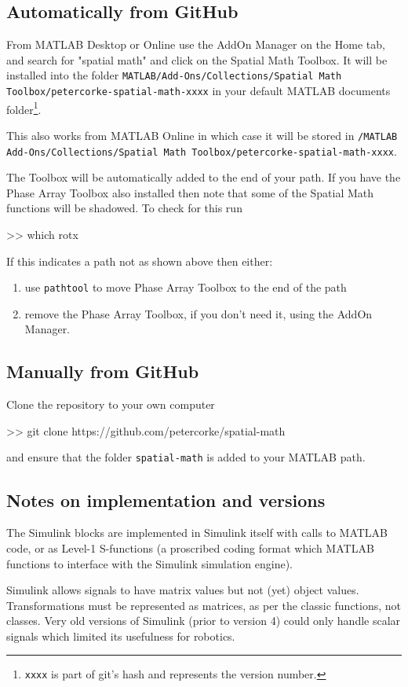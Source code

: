 \documentclass[a4paper,twoside]{report}
\begin{document}
\subsection{Automatically from GitHub}
From MATLAB Desktop or Online use the AddOn Manager on the Home tab, and search for "spatial math" and click on the Spatial Math Toolbox.
It will be installed into the folder \texttt{MATLAB/Add-Ons/Collections/Spatial Math Toolbox/petercorke-spatial-math-xxxx} in your default MATLAB
documents folder\footnote{\texttt{xxxx} is part of git's hash and represents the version number.}.

This also works from MATLAB Online in which case it will be stored in  \texttt{/MATLAB Add-Ons/Collections/Spatial Math Toolbox/petercorke-spatial-math-xxxx}.

The Toolbox will be automatically added to the end of your path.  If you have the Phase Array Toolbox also installed then note that some of the Spatial Math functions will be shadowed.  To check for this run
\begin{Code}
>> which rotx
\end{Code}
If this indicates a path not as shown above then  either:
\begin{enumerate}
\item use \texttt{pathtool} to move Phase Array Toolbox to the end of the path
\item remove the Phase Array Toolbox, if you don't need it, using the AddOn Manager. 
\end{enumerate}

\subsection{Manually from GitHub}
Clone the repository to your own computer
\begin{Code}
>> git clone https://github.com/petercorke/spatial-math
\end{Code}
and ensure that the folder \texttt{spatial-math} is added to your MATLAB path.


\subsection{Notes on implementation and versions}
The Simulink blocks are implemented in Simulink itself with calls to MATLAB code, or as Level-1 S-functions (a proscribed coding format which MATLAB functions
to  interface with the Simulink simulation engine).

Simulink allows signals to have matrix values but not (yet) object values.  Transformations must be represented as matrices, as per the classic functions, not classes.
Very old versions of Simulink (prior to version 4) could only handle scalar signals which limited its usefulness for robotics.
\end{document}
